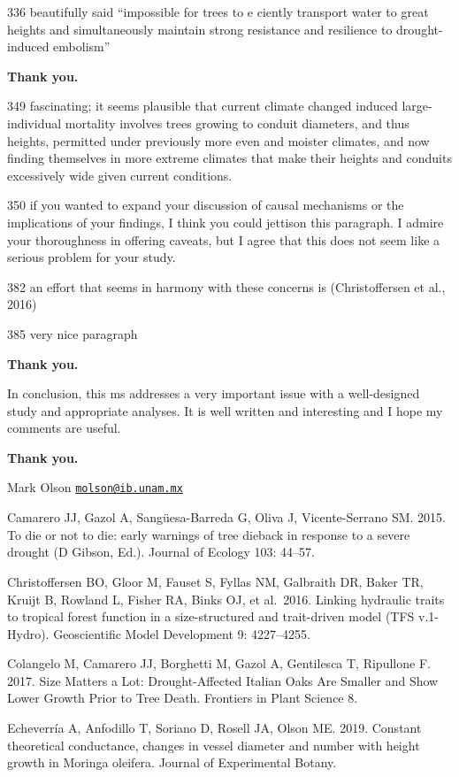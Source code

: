 \documentclass[
]{article}
\begin{document}
336 beautifully said ``impossible for trees to e ciently transport water
to great heights and simultaneously maintain strong resistance and
resilience to drought-induced embolism''

\textbf{Thank you.}

349 fascinating; it seems plausible that current climate changed induced
large-individual mortality involves trees growing to conduit diameters,
and thus heights, permitted under previously more even and moister
climates, and now finding themselves in more extreme climates that make
their heights and conduits excessively wide given current conditions.

350 if you wanted to expand your discussion of causal mechanisms or the
implications of your findings, I think you could jettison this
paragraph. I admire your thoroughness in offering caveats, but I agree
that this does not seem like a serious problem for your study.

382 an effort that seems in harmony with these concerns is
(Christoffersen et al., 2016)

385 very nice paragraph

\textbf{Thank you.}

In conclusion, this ms addresses a very important issue with a
well-designed study and appropriate analyses. It is well written and
interesting and I hope my comments are useful.

\textbf{Thank you.}

Mark Olson
\href{mailto:molson@ib.unam.mx}{\nolinkurl{molson@ib.unam.mx}}

Camarero JJ, Gazol A, Sangüesa-Barreda G, Oliva J, Vicente-Serrano SM.
2015. To die or not to die: early warnings of tree dieback in response
to a severe drought (D Gibson, Ed.). Journal of Ecology 103: 44--57.

Christoffersen BO, Gloor M, Fauset S, Fyllas NM, Galbraith DR, Baker TR,
Kruijt B, Rowland L, Fisher RA, Binks OJ, et al.~2016. Linking hydraulic
traits to tropical forest function in a size-structured and trait-driven
model (TFS v.1-Hydro). Geoscientific Model Development 9: 4227--4255.

Colangelo M, Camarero JJ, Borghetti M, Gazol A, Gentilesca T, Ripullone
F. 2017. Size Matters a Lot: Drought-Affected Italian Oaks Are Smaller
and Show Lower Growth Prior to Tree Death. Frontiers in Plant Science 8.

Echeverría A, Anfodillo T, Soriano D, Rosell JA, Olson ME. 2019.
Constant theoretical conductance, changes in vessel diameter and number
with height growth in Moringa oleifera. Journal of Experimental Botany.
\end{document}
